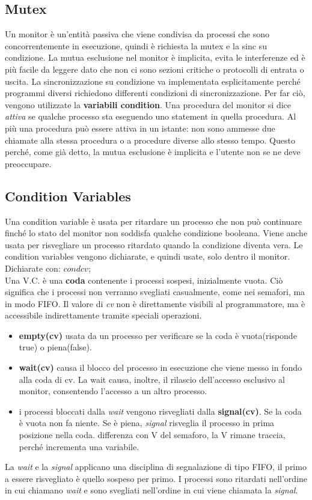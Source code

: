 \documentclass[10pt,a4paper]{book}
\begin{document}
\subsection{Mutex}
Un monitor è un'entità passiva che viene condivisa da processi che sono concorrentemente in esecuzione, quindi è richiesta la mutex e la sinc su condizione.
La mutua esclusione nel monitor è implicita, evita le interferenze ed è più facile da leggere dato che non ci sono sezioni critiche o protocolli di entrata o uscita.
La sincronizzazione su condizione va implementata esplicitamente perché programmi diversi richiedono differenti condizioni di sincronizzazione. Per far ciò, vengono utilizzate la \textbf{variabili condition}.
Una procedura del monitor si dice \textit{attiva} se qualche processo sta eseguendo uno statement in quella procedura. Al più una procedura può essere attiva in un istante: non sono ammesse due chiamate alla stessa procedura o a procedure diverse allo stesso tempo. Questo perché, come già detto, la mutua esclusione è implicita e l'utente non se ne deve preoccupare.

\subsection{Condition Variables}
Una condition variable è usata per ritardare un processo che non può continuare finché lo stato del monitor non soddisfa qualche condizione booleana. Viene anche usata per risvegliare un processo ritardato quando la condizione diventa vera.
Le condition variables vengono dichiarate, e quindi usate, solo dentro il monitor.
Dichiarate con: $ cond cv; $ \\
Una V.C. è una \textbf{coda} contenente i processi sospesi, inizialmente vuota. Ciò significa che i processi non verranno svegliati casualmente, come nei semafori, ma in modo FIFO. Il valore di \textit{cv} non è direttamente visibili al programmatore, ma è accessibile indirettamente tramite speciali operazioni.
\begin{itemize}
\item \textbf{empty(cv)} usata da un processo per verificare se la coda è vuota(risponde true) o piena(false).
\item \textbf{wait(cv)} causa il blocco del processo in esecuzione che viene messo in fondo alla coda di cv. La wait causa, inoltre, il rilascio dell'accesso esclusivo al monitor, consentendo l'accesso a un altro processo.
\item i processi bloccati dalla \textit{wait} vengono risvegliati dalla \textbf{signal(cv)}. Se la coda è vuota non fa niente. Se è piena, \textit{signal} risveglia il processo in prima posizione nella coda.
differenza con V del semaforo, la V rimane traccia, perché incrementa una variabile.
\end{itemize}
La \textit{wait} e la \textit{signal} applicano una disciplina di segnalazione di tipo FIFO, il primo a essere risvegliato è quello sospeso per primo. I processi sono ritardati nell'ordine in cui chiamano \textit{wait} e sono svegliati nell'ordine in cui viene chiamata la \textit{signal}.
\end{document}
